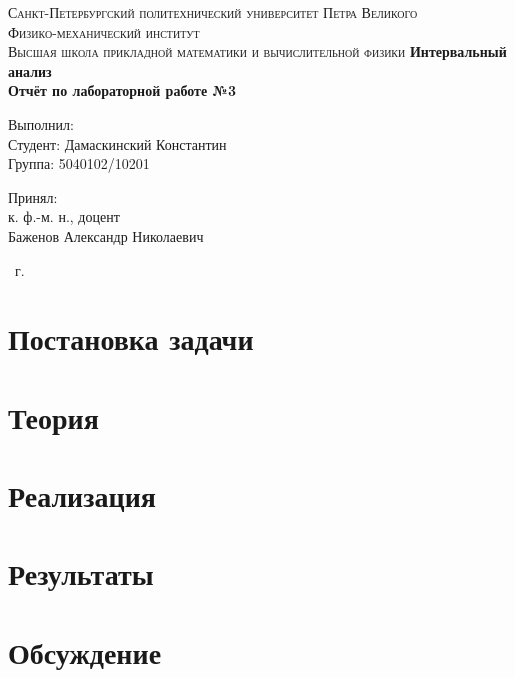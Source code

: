 \documentclass[14pt,a4paper,article]{ncc}
\begin{document}
\begin{titlepage}
    \begin{center}
        \textsc{
            Санкт-Петербургский политехнический университет Петра Великого \\[5mm]
            Физико-механический институт\\[2mm]
            Высшая школа прикладной математики и вычислительной физики
        }   
        \vfill
        \textbf{\large
            Интервальный анализ\\
            Отчёт по лабораторной работе №3 \\[3mm]
        }                
    \end{center}

    \vfill
    \hfill
    \begin{minipage}{0.5\textwidth}
        Выполнил: \\[2mm]   
		Студент: Дамаскинский Константин \\
		Группа: 5040102/10201\\
    \end{minipage}

	\hfill
	\begin{minipage}{0.5\textwidth}
		Принял: \\[2mm]
		к. ф.-м. н., доцент \\   
		Баженов Александр Николаевич
	\end{minipage}

    \vfill
    \begin{center}
        \theyear\ г.
    \end{center}
\end{titlepage}

\tableofcontents
\listoffigures
\newpage

\section{Постановка задачи}


\section{Теория}


\section{Реализация}


\section{Результаты}


\section{Обсуждение}



\printbibliography


\end{document}
